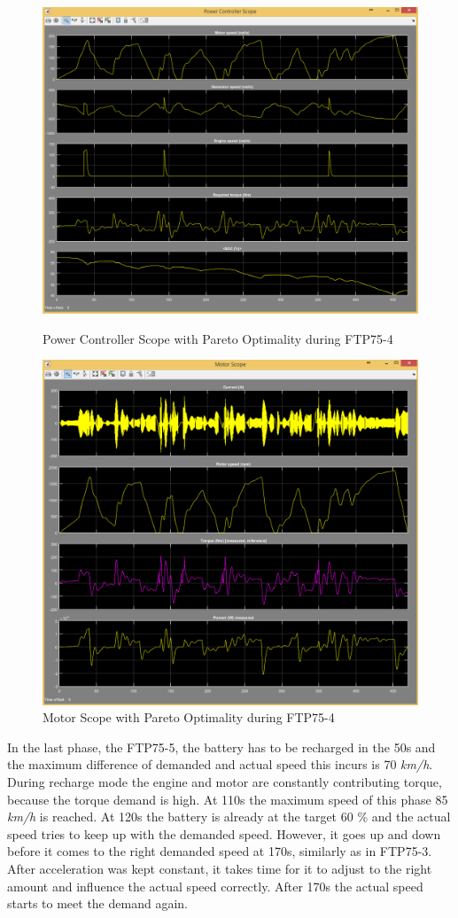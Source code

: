 \begin{figure}[hp]
\centering
\includegraphics[scale=0.4]{figures/Pareto/FTP75-4/powerController05Juli}
\caption{Power Controller Scope with Pareto Optimality during FTP75-4}
\label{fig:pcpo4}
\includegraphics[scale=0.37]{figures/Pareto/FTP75-4/motor05Juli}
\caption{Motor Scope with Pareto Optimality during FTP75-4}
\label{fig:mpo4}
\end{figure}


In the last phase, the FTP75-5, the battery has to be recharged in the 50s and the maximum difference of demanded and actual speed this incurs is 70 \textit{km/h}. During recharge mode the engine and motor are constantly contributing torque, because the torque demand is high. At 110s the maximum speed of this phase 85 \textit{km/h} is reached. At 120s the battery is already at the target 60 \% and the actual speed tries to keep up with the demanded speed. However, it goes up and down before it comes to the right demanded speed at 170s, similarly as in FTP75-3. After acceleration was kept constant, it takes time for it to adjust to the right amount and influence the actual speed correctly. After 170s the actual speed starts to meet the demand again. 

